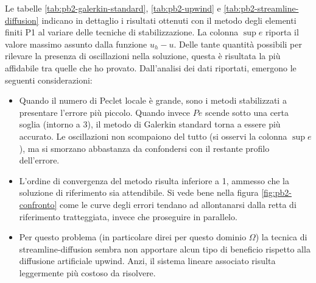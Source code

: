 \documentclass[a4paper]{article}
\begin{document}
Le tabelle \ref{tab:pb2-galerkin-standard}, \ref{tab:pb2-upwind}
e \ref{tab:pb2-streamline-diffusion} indicano in dettaglio i risultati ottenuti con il
metodo degli elementi finiti P1 al variare delle tecniche di stabilizzazione.
La colonna $\sup e$ riporta il valore massimo assunto dalla funzione $u_h - u$.
Delle tante quantità possibili per rilevare la presenza di oscillazioni nella
soluzione, questa è risultata la più affidabile tra quelle che ho provato.
Dall'analisi dei dati riportati, emergono le seguenti considerazioni:
\begin{itemize}
\item Quando il numero di Peclet locale è grande,
	sono i metodi stabilizzati a presentare l'errore più piccolo.
	Quando invece $Pe$ scende sotto una certa soglia (intorno a 3),
	il metodo di Galerkin standard torna a essere più accurato.
	Le oscillazioni non scompaiono del tutto (si osservi la colonna $\sup e$),
	ma si smorzano abbastanza da confondersi con il restante profilo dell'errore.
\item L'ordine di convergenza del metodo risulta inferiore a 1,
	ammesso che la soluzione di riferimento sia attendibile.
	Si vede bene nella figura \ref{fig:pb2-confronto} come le curve
	degli errori tendano ad allontanarsi dalla retta di riferimento tratteggiata,
	invece che proseguire in parallelo.
\item Per questo problema (in particolare direi per questo dominio $\Omega$)
	la tecnica di streamline-diffusion sembra non apportare alcun tipo
	di beneficio rispetto alla diffusione artificiale upwind.
	Anzi, il sistema lineare associato risulta leggermente più costoso da risolvere.
\end{itemize}
\end{document}
